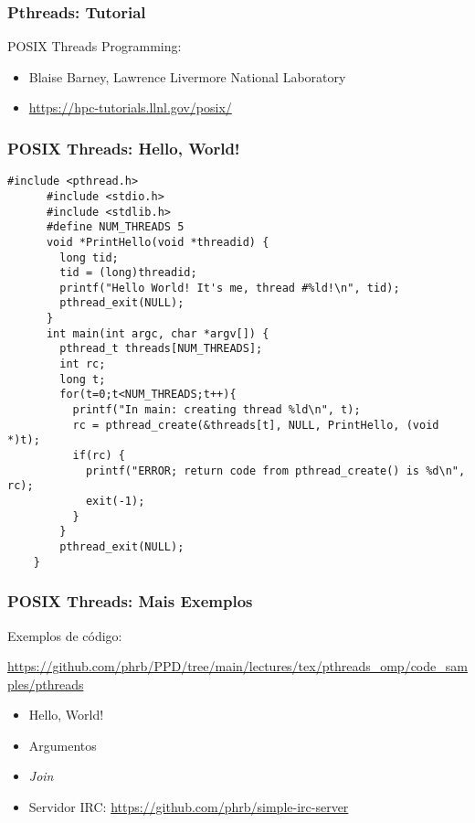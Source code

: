 \documentclass[10pt, compress, aspectratio=169, xcolor={table,usenames,dvipsnames}]{beamer}
\begin{document}
\begin{frame}
    \frametitle{Pthreads: Tutorial}
    \alert{POSIX Threads Programming}:
    \begin{itemize}
        \item Blaise Barney, Lawrence Livermore National Laboratory
        \item \url{https://hpc-tutorials.llnl.gov/posix/}
    \end{itemize}
\end{frame}

\begin{frame}[fragile]
  \frametitle{POSIX Threads: Hello, World!}
  \begin{adjustbox}{width=.65\textwidth,center}
    \begin{lstlisting}[basicstyle=\ttfamily\small]
      #include <pthread.h>
      #include <stdio.h>
      #include <stdlib.h>
      #define NUM_THREADS 5
      void *PrintHello(void *threadid) {
        long tid;
        tid = (long)threadid;
        printf("Hello World! It's me, thread #%ld!\n", tid);
        pthread_exit(NULL);
      }
      int main(int argc, char *argv[]) {
        pthread_t threads[NUM_THREADS];
        int rc;
        long t;
        for(t=0;t<NUM_THREADS;t++){
          printf("In main: creating thread %ld\n", t);
          rc = pthread_create(&threads[t], NULL, PrintHello, (void *)t);
          if(rc) {
            printf("ERROR; return code from pthread_create() is %d\n", rc);
            exit(-1);
          }
        }
        pthread_exit(NULL);
    }    \end{lstlisting}
  \end{adjustbox}
\end{frame}

\begin{frame}
    \frametitle{POSIX Threads: Mais Exemplos}
    Exemplos de código:

    \url{https://github.com/phrb/PPD/tree/main/lectures/tex/pthreads_omp/code_samples/pthreads}

    \begin{itemize}
        \item Hello, World!
        \item Argumentos
        \item \textit{Join}
        \item Servidor IRC: \url{https://github.com/phrb/simple-irc-server}
    \end{itemize}
\end{frame}
\end{document}

